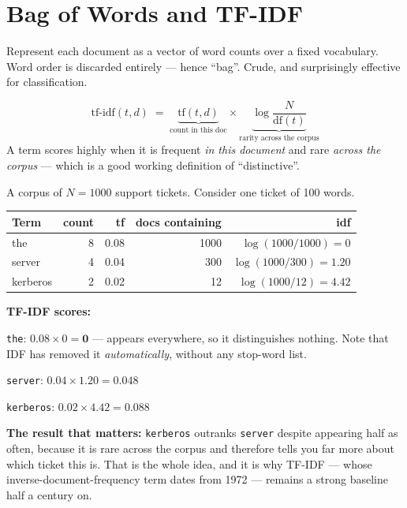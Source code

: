 \section{Bag of Words and TF-IDF}

\begin{definitionbox}
Represent each document as a vector of word counts over a fixed vocabulary. Word
order is discarded entirely --- hence ``bag''. Crude, and surprisingly effective for
classification.
\end{definitionbox}

\begin{definitionbox}[TF-IDF]
\[
\text{tf-idf}(t, d) \;=\; \underbrace{\text{tf}(t,d)}_{\text{count in this doc}}
\times
\underbrace{\log\frac{N}{\text{df}(t)}}_{\text{rarity across the corpus}}
\]
A term scores highly when it is frequent \emph{in this document} and rare
\emph{across the corpus} --- which is a good working definition of ``distinctive''.
\end{definitionbox}

\begin{worked}
A corpus of $N = 1000$ support tickets. Consider one ticket of 100 words.

\smallskip
\begin{center}
\begin{tabular}{@{}lrrrr@{}}
\toprule
\textbf{Term} & \textbf{count} & \textbf{tf} & \textbf{docs containing} & \textbf{idf} \\
\midrule
the         & 8 & 0.08 & 1000 & $\log(1000/1000)=0$ \\
server      & 4 & 0.04 & 300  & $\log(1000/300)=1.20$ \\
kerberos    & 2 & 0.02 & 12   & $\log(1000/12)=4.42$ \\
\bottomrule
\end{tabular}
\end{center}

\smallskip
\textbf{TF-IDF scores:}
\begin{tight}
  \item \texttt{the}: $0.08 \times 0 = \mathbf{0}$ --- appears everywhere, so it
        distinguishes nothing. Note that IDF has removed it \emph{automatically},
        without any stop-word list.
  \item \texttt{server}: $0.04 \times 1.20 = \mathbf{0.048}$
  \item \texttt{kerberos}: $0.02 \times 4.42 = \mathbf{0.088}$
\end{tight}

\smallskip
\textbf{The result that matters:} \texttt{kerberos} outranks \texttt{server}
despite appearing half as often, because it is rare across the corpus and therefore
tells you far more about which ticket this is. That is the whole idea, and it is
why TF-IDF --- whose inverse-document-frequency term dates from 1972 --- remains a
strong baseline half a century on.
\end{worked}

